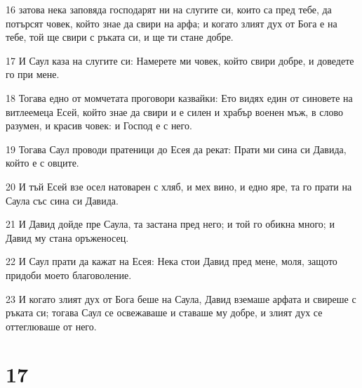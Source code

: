 \par 16 затова нека заповяда господарят ни на слугите си, които са пред тебе, да потърсят човек, който знае да свири на арфа; и когато злият дух от Бога е на тебе, той ще свири с ръката си, и ще ти стане добре.
\par 17 И Саул каза на слугите си: Намерете ми човек, който свири добре, и доведете го при мене.
\par 18 Тогава едно от момчетата проговори казвайки: Ето видях един от синовете на витлеемеца Есей, който знае да свири и е силен и храбър военен мъж, в слово разумен, и красив човек: и Господ е с него.
\par 19 Тогава Саул проводи пратеници до Есея да рекат: Прати ми сина си Давида, който е с овците.
\par 20 И тъй Есей взе осел натоварен с хляб, и мех вино, и едно яре, та го прати на Саула със сина си Давида.
\par 21 И Давид дойде пре Саула, та застана пред него; и той го обикна много; и Давид му стана оръженосец.
\par 22 И Саул прати да кажат на Есея: Нека стои Давид пред мене, моля, защото придоби моето благоволение.
\par 23 И когато злият дух от Бога беше на Саула, Давид вземаше арфата и свиреше с ръката си; тогава Саул се освежаваше и ставаше му добре, и злият дух се оттеглюваше от него.

\chapter{17}

